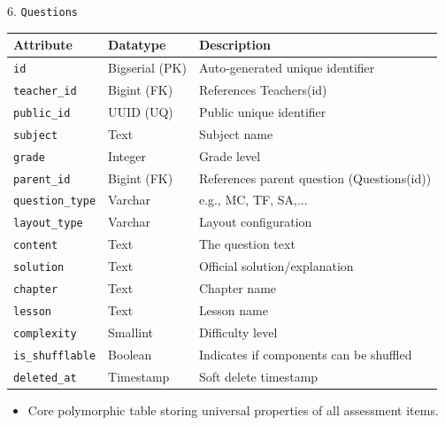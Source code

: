 \documentclass[aspectratio=169, 10pt]{beamer}
\begin{document}
\begin{frame}{6. \texttt{Questions}}
    \centering
    \scriptsize
    \begin{tabular}{|l|l|p{8cm}|}
        \hline
        \textbf{Attribute} & \textbf{Datatype} & \textbf{Description} \\ \hline
        \texttt{id} & Bigserial (PK) & Auto-generated unique identifier\\ \hline
        \texttt{teacher\_id} & Bigint (FK) & References Teachers(id)\\ \hline
        \texttt{public\_id} & UUID (UQ) & Public unique identifier\\ \hline
        \texttt{subject} & Text & Subject name\\ \hline
        \texttt{grade} & Integer & Grade level\\ \hline
        \texttt{parent\_id} & Bigint (FK) & References parent question (Questions(id))\\ \hline
        \texttt{question\_type} & Varchar & e.g., MC, TF, SA,...\\\hline
        \texttt{layout\_type} & Varchar & Layout configuration\\\hline
        \texttt{content} & Text & The question text\\ \hline
        \texttt{solution} & Text & Official solution/explanation\\\hline
        \texttt{chapter} & Text & Chapter name\\\hline
        \texttt{lesson} & Text & Lesson name\\\hline
        \texttt{complexity} & Smallint & Difficulty level\\ \hline
        \texttt{is\_shufflable} & Boolean & Indicates if components can be shuffled\\ \hline
        \texttt{deleted\_at} & Timestamp & Soft delete timestamp\\ \hline
    \end{tabular}
    \vspace{0.1cm}
    \begin{itemize}
        \item Core polymorphic table storing universal properties of all assessment items.
    \end{itemize}
\end{frame}
\end{document}
